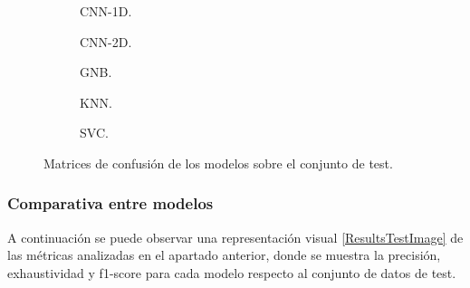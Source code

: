     \begin{figure}[H]
        \centering
        \begin{subfigure}{0.4\textwidth}
            
            \caption{CNN-1D.}
            \label{ConfusionMatrixTestImages:1D}
        \end{subfigure}
        \hspace{3em}
        \begin{subfigure}[b]{0.4\textwidth}
            
            \caption{CNN-2D.} 
            \label{ConfusionMatrixTestImages:2D}
        \end{subfigure}
        \vspace*{0.5 cm}
        \begin{subfigure}[b]{0.4\textwidth}
            
            \caption{GNB.}
            \label{ConfusionMatrixTestImages:GNB}
        \end{subfigure}
        \hspace{3em}
        \begin{subfigure}[b]{0.4\textwidth}
            
            \caption{KNN.}
            \label{ConfusionMatrixTestImages:KNN}
        \end{subfigure}

        \begin{subfigure}[b]{0.4\textwidth}
            
            \caption{SVC.}
            \label{ConfusionMatrixTestImages:SVC}
        \end{subfigure}

        \caption{Matrices de confusión de los modelos sobre el conjunto de test.}
        \label{ConfusionMatrixTestImages}
     \end{figure}

  \subsubsection{Comparativa entre modelos}

    A continuación se puede observar una representación visual \eqref{ResultsTestImage} de las métricas analizadas en el apartado anterior, donde se muestra la precisión, exhaustividad y f1-score para cada modelo respecto al conjunto de datos de test.

